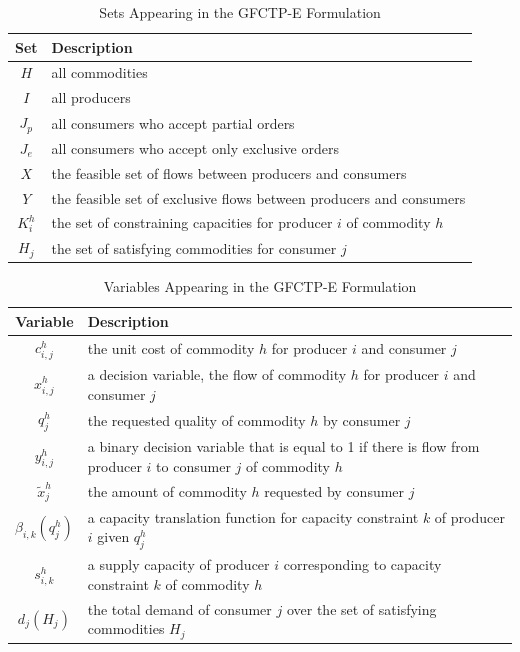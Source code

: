 \begin{table} [h!]
\centering
\begin{tabularx}{\columnwidth-10pt}{|c|X|} %
\hline
Set         & Description \\
\hline
$H$         & all commodities  \\
$I$         & all producers  \\
$J_{p}$     & all consumers who accept partial orders  \\
$J_{e}$     & all consumers who accept only exclusive orders  \\
$X$         & the feasible set of flows between producers and consumers  \\
$Y$         & the feasible set of exclusive flows between 
            producers and consumers  \\
$K_{i}^{h}$ & the set of constraining capacities for 
            producer $i$ of commodity $h$  \\
$H_{j}$     & the set of satisfying commodities for consumer $j$  \\
\hline
\end{tabularx}
\caption{Sets Appearing in the GFCTP-E Formulation}
\label{tbl:GFCTP-E-sets}
\end{table}

\begin{table} [h!]
\centering
\begin{tabularx}{\columnwidth-10pt}{|c|X|} %
\hline
Variable    & Description \\
\hline
$c_{i,j}^{h}$             & the unit cost of commodity $h$ 
                          for producer $i$ and consumer $j$  \\
$x_{i,j}^{h}$             & a decision variable, the flow of commodity $h$ 
                          for producer $i$ and consumer $j$  \\
$q_{j}^{h}$               & the requested quality of commodity $h$ 
                          by consumer $j$  \\
$y_{i,j}^{h}$             & a binary decision variable that is equal to 1 if 
                          there is flow from producer $i$ to consumer $j$ of 
                          commodity $h$ \\
$\tilde{x}_{j}^{h}$       & the amount of commodity $h$ requested by 
                          consumer $j$ \\
$\beta_{i,k}(q_{j}^{h})$  & a capacity translation function for capacity 
                          constraint $k$ of producer $i$ given $q_{j}^{h}$ \\
$s_{i,k}^{h}$             & a supply capacity of producer $i$ corresponding to 
                          capacity constraint $k$ of commodity $h$ \\
$d_{j}(H_{j})$            & the total demand of consumer $j$ over the set of 
                          satisfying commodities $H_{j}$ \\
\hline
\end{tabularx}
\caption{Variables Appearing in the GFCTP-E Formulation}
\label{tbl:GFCTP-E-vars}
\end{table}

